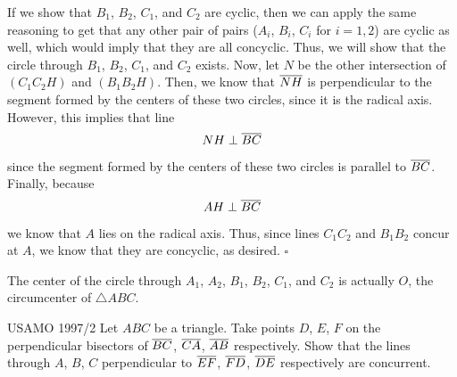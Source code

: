 \documentclass{article}
\begin{document}
If we show that $B_1$, $B_2$, $C_1$, and $C_2$ are cyclic, then we can apply the same reasoning to get that any other pair of pairs ($A_i$, $B_i$, $C_i$ for $i = 1,2$) are cyclic as well, which would imply that they are all concyclic. Thus, we will show that the circle through $B_1$, $B_2$, $C_1$, and $C_2$ exists. Now, let $N$ be the other intersection of $(C_1C_2H)$ and $(B_1B_2H)$. Then, we know that $\overline{NH}$ is perpendicular to the segment formed by the centers of these two circles, since it is the radical axis. However, this implies that line \[NH \perp \overline{BC}\] since the segment formed by the centers of these two circles is parallel to $\overline{BC}$. Finally, because \[AH \perp \overline{BC}\] we know that $A$ lies on the radical axis. Thus, since lines $C_1C_2$ and $B_1B_2$ concur at $A$, we know that they are concyclic, as desired. $\square$

\begin{remark*}
The center of the circle through $A_1$, $A_2$, $B_1$, $B_2$, $C_1$, and $C_2$ is actually $O$, the circumcenter of $\triangle ABC$.
\end{remark*}

\newpage

\begin{problem}[2.30]{USAMO 1997/2}
Let $ABC$ be a triangle. Take points $D$, $E$, $F$ on the perpendicular bisectors of $\overline{BC}$, $\overline{CA}$, $\overline{AB}$ respectively. Show that the lines through $A$, $B$, $C$ perpendicular to $\overline{EF}$, $\overline{FD}$, $\overline{DE}$ respectively are concurrent.
\end{problem}
\end{document}
